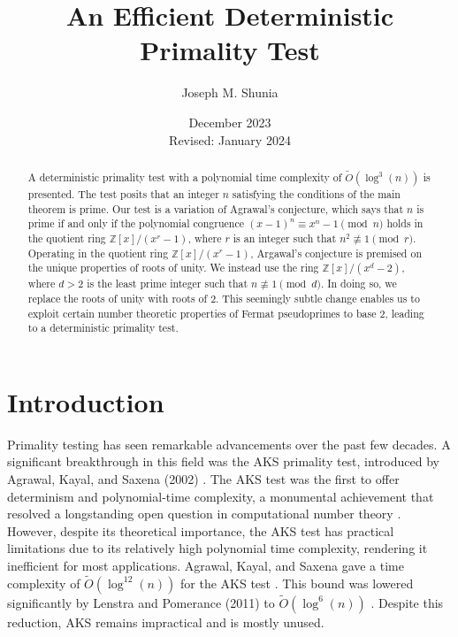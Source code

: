 \documentclass{article}
\title{An Efficient Deterministic Primality Test}
\author{Joseph M. Shunia}
\date{December 2023 \\ \small Revised: January 2024 \normalsize}
\theoremstyle{plain}
\theoremstyle{definition}
\begin{document}
\maketitle

\begin{abstract}
A deterministic primality test with a polynomial time complexity of $\tilde{O}(\log^3(n))$ is presented. The test posits that an integer $n$ satisfying the conditions of the main theorem is prime. Our test is a variation of Agrawal's conjecture, which says that $n$ is prime if and only if the polynomial congruence $(x - 1)^n \equiv x^n - 1 \pmod{n}$ holds in the quotient ring $\mathbb{Z}[x]/(x^r - 1)$, where $r$ is an integer such that $n^2 \not\equiv 1 \pmod{r}$. Operating in the quotient ring $\mathbb{Z}[x]/(x^r - 1)$, Argawal's conjecture is premised on the unique properties of roots of unity. We instead use the ring $\mathbb{Z}[x]/(x^d - 2)$, where $d > 2$ is the least prime integer such that $n \not\equiv 1 \pmod{d}$. In doing so, we replace the roots of unity with roots of $2$. This seemingly subtle change enables us to exploit certain number theoretic properties of Fermat pseudoprimes to base $2$, leading to a deterministic primality test.
\end{abstract}

\section{Introduction}

Primality testing has seen remarkable advancements over the past few decades. A significant breakthrough in this field was the AKS primality test, introduced by Agrawal, Kayal, and Saxena (2002) \cite{aks2002}. The AKS test was the first to offer determinism and polynomial-time complexity, a monumental achievement that resolved a longstanding open question in computational number theory \cite{goldreich2008}. However, despite its theoretical importance, the AKS test has practical limitations due to its relatively high polynomial time complexity, rendering it inefficient for most applications. Agrawal, Kayal, and Saxena gave a time complexity of $\tilde{O}(\log^{12}(n))$ for the AKS test \cite{aks2002}. This bound was lowered significantly by Lenstra and Pomerance (2011) to $\tilde{O}(\log^6(n))$ \cite{lenstra2011}. Despite this reduction, AKS remains impractical and is mostly unused.
\end{document}
